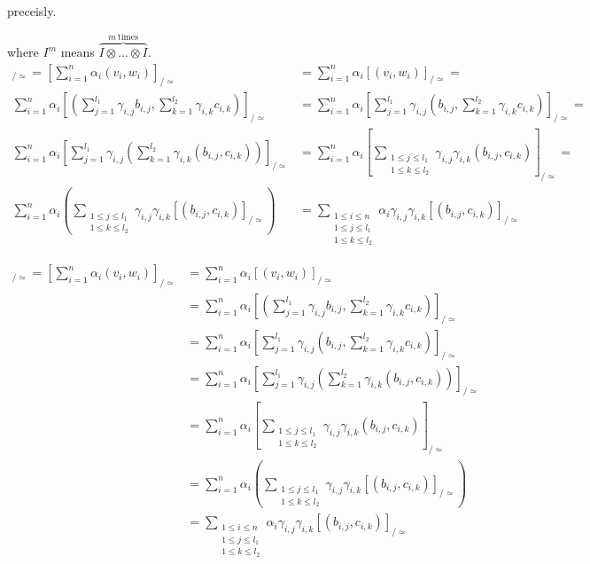 \documentclass[a4paper]{article}
\begin{document}
preceisly.


where $I^m$ means $\overbrace{I \otimes \dots \otimes I}^{m \mathrm{\ times}}$. \\

\begin{align*}
[z]_{/\simeq} = \left[\sum^n_{i = 1}\alpha_i(v_i,w_i)\right]_{/\simeq} &=
\sum^n_{i = 1}\alpha_i[(v_i,w_i)]_{/\simeq} = \\
\sum^n_{i = 1}\alpha_i\left[\left(\sum^{l_1}_{j=1}\gamma_{i,j}b_{i,j},
\sum^{l_2}_{k=1}\gamma_{i,k}c_{i,k}\right)\right]_{/\simeq} &=
\sum^n_{i = 1}\alpha_i\left[\sum^{l_1}_{j=1}\gamma_{i,j}\left(b_{i,j},
\sum^{l_2}_{k=1}\gamma_{i,k}c_{i,k}\right)\right]_{/\simeq} = \\
\sum^n_{i = 1}\alpha_i\left[\sum^{l_1}_{j=1}\gamma_{i,j}\left(\sum^{l_2}_{k=1}\gamma_{i,k}
\left(b_{i,j},c_{i,k}\right)\right)\right]_{/\simeq} &=
\sum^n_{i = 1}\alpha_i\left[\sum_{\substack{1 \leq j \leq l_1 \\ 1 \leq k \leq l_2}}
\gamma_{i,j}\gamma_{i,k}(b_{i,j}, c_{i,k})\right]_{/\simeq} = \\
\sum^n_{i = 1}\alpha_i\left(\sum_{\substack{1 \leq j \leq l_1 \\ 1 \leq k \leq l_2}}
\gamma_{i,j}\gamma_{i,k}[(b_{i,j}, c_{i,k})]_{/\simeq}\right) &=
\sum_{\substack{1 \leq i \leq n \\1 \leq j \leq l_1 \\ 1 \leq k \leq l_2}}
\alpha_i\gamma_{i,j}\gamma_{i,k}[(b_{i,j}, c_{i,k})]_{/\simeq}
\end{align*}

\begin{align*}
[z]_{/\simeq} = \left[\sum^n_{i = 1}\alpha_i(v_i,w_i)\right]_{/\simeq} &=
\sum^n_{i = 1}\alpha_i[(v_i,w_i)]_{/\simeq} \\
&= \sum^n_{i = 1}\alpha_i\left[\left(\sum^{l_1}_{j=1}\gamma_{i,j}b_{i,j},
\sum^{l_2}_{k=1}\gamma_{i,k}c_{i,k}\right)\right]_{/\simeq} \\
&= \sum^n_{i = 1}\alpha_i\left[\sum^{l_1}_{j=1}\gamma_{i,j}\left(b_{i,j},
\sum^{l_2}_{k=1}\gamma_{i,k}c_{i,k}\right)\right]_{/\simeq} \\
&= \sum^n_{i = 1}\alpha_i\left[\sum^{l_1}_{j=1}\gamma_{i,j}\left(\sum^{l_2}_{k=1}\gamma_{i,k}
\left(b_{i,j},c_{i,k}\right)\right)\right]_{/\simeq} \\
&= \sum^n_{i = 1}\alpha_i\left[\sum_{\substack{1 \leq j \leq l_1 \\ 1 \leq k \leq l_2}}
\gamma_{i,j}\gamma_{i,k}(b_{i,j}, c_{i,k})\right]_{/\simeq} \\
&= \sum^n_{i = 1}\alpha_i\left(\sum_{\substack{1 \leq j \leq l_1 \\ 1 \leq k \leq l_2}}
\gamma_{i,j}\gamma_{i,k}[(b_{i,j}, c_{i,k})]_{/\simeq}\right) \\
&= \sum_{\substack{1 \leq i \leq n \\1 \leq j \leq l_1 \\ 1 \leq k \leq l_2}}
\alpha_i\gamma_{i,j}\gamma_{i,k}[(b_{i,j}, c_{i,k})]_{/\simeq}
\end{align*}
\end{document}
